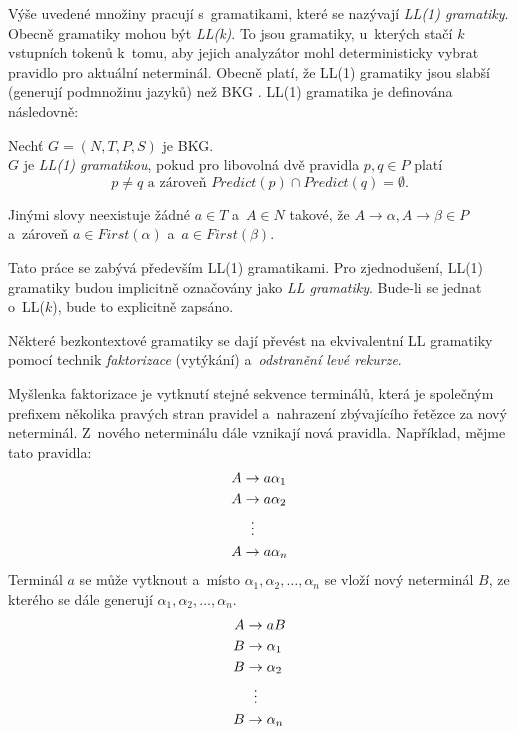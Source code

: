 Výše uvedené množiny pracují s~gramatikami, které se nazývají \emph{LL(1) gramatiky}.
Obecně gramatiky mohou být \emph{LL(k)}.
To jsou gramatiky, u~kterých stačí $k$ vstupních tokenů k~tomu, aby jejich analyzátor mohl deterministicky vybrat pravidlo pro aktuální neterminál.
Obecně platí, že LL(1) gramatiky jsou slabší (generují podmnožinu jazyků) než BKG \cite{medunaElementsOfCompDesign}.
LL(1) gramatika je definována následovně:
\begin{definition}
    Nechť $G = (N, T, P, S)$ je BKG.\\
    $G$ je \emph{LL(1) gramatikou}, pokud pro libovolná dvě pravidla $p, q \in P$ platí
    \begin{equation*}
        p \neq q \text{ a zároveň } Predict(p) \cap Predict(q) = \emptyset.
    \end{equation*}
\end{definition}
Jinými slovy neexistuje žádné $a \in T$ a~$A \in N$ takové, že $A \rightarrow \alpha, A \rightarrow \beta \in P$ a~zároveň $a \in First(\alpha)$ a~$a \in First(\beta)$.

\begin{convention}
    Tato práce se zabývá především LL(1) gramatikami.
    Pro zjednodušení, LL(1) gramatiky budou implicitně označovány jako \emph{LL gramatiky}.
    Bude-li se jednat o~LL($k$), bude to explicitně zapsáno.
\end{convention}

Některé bezkontextové gramatiky se dají převést na ekvivalentní LL gramatiky pomocí technik \emph{faktorizace} (vytýkání) a~\emph{odstranění levé rekurze}.

Myšlenka faktorizace je vytknutí stejné sekvence terminálů, která je společným prefixem několika pravých stran pravidel a~nahrazení zbývajícího řetězce za nový neterminál.
Z~nového neterminálu dále vznikají nová pravidla.
Například, mějme tato pravidla:
\begin{align*}
    A &\rightarrow a\alpha_1\\
    A &\rightarrow a\alpha_2\\
      &\vdotswithin{\rightarrow} \\
    A &\rightarrow a\alpha_n
\end{align*}
Terminál $a$ se může vytknout a~místo $\alpha_1, \alpha_2, \ldots, \alpha_n$ se vloží nový neterminál $B$, ze kterého se dále generují $\alpha_1, \alpha_2, \ldots, \alpha_n$.
\begin{align*}
    A &\rightarrow aB\\
    B &\rightarrow \alpha_1\\
    B &\rightarrow \alpha_2\\
      &\vdotswithin{\rightarrow}\\
    B &\rightarrow \alpha_n
\end{align*}


